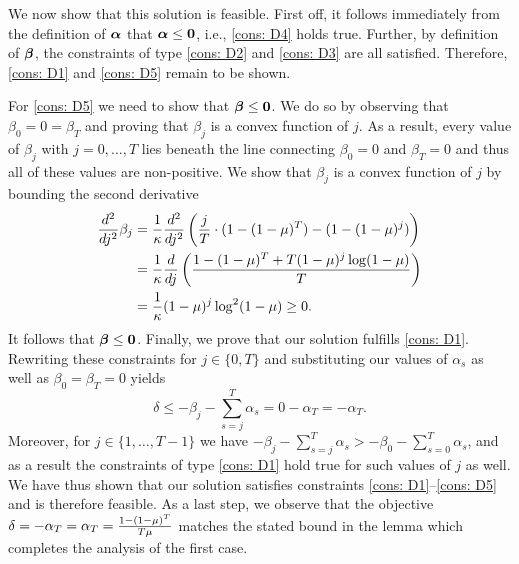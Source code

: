     We now show that this solution is feasible. First off, it follows immediately from the definition of $\bm{\alpha}$ that $\bm{\alpha} \leq \mathbf{0}$, i.e., \ref{cons: D4} holds true. Further, by definition of $\bm{\beta}$, the constraints of type \ref{cons: D2} and \ref{cons: D3} are all satisfied. Therefore, \ref{cons: D1} and \ref{cons: D5} remain to be shown.

    For \ref{cons: D5} we need to show that $\bm{\beta}\leq \mathbf{0}$. We do so by observing that $\beta_0=0=\beta_T$ and proving that $\beta_j$ is a convex function of $j$. As a result, every value of $\beta_j$ with $j = 0, \ldots, T$ lies beneath the line connecting $\beta_0 = 0$ and $\beta_T = 0$ and thus all of these values are non-positive. We show that $\beta_j$ is a convex function of $j$ by bounding the second derivative
     \begin{align*}
         \frac{d^2}{dj^2} \beta_j &= \frac{1}{\kappa} \frac{d^2}{dj^2} \left(  \frac{j}{T} \cdot (1-(1-\mu)^T)-(1-(1-\mu)^j) \right)\\
         &= \frac{1}{\kappa} \frac{d}{dj} \left( \frac{1 - (1-\mu)^T + T (1-\mu)^j \log(1-\mu)}{T} \right)\\
         &= \frac{1}{\kappa} (1-\mu)^j \log^2(1-\mu)\geq 0.
     \end{align*}
    It follows that $\bm{\beta}\leq \mathbf{0}$. Finally, we prove that our solution fulfills  \ref{cons: D1}. Rewriting these constraints for $j\in\{0,T\}$  and substituting our values of $\alpha_s$ as well as $\beta_0=\beta_T=0$  yields 
$$
\delta \leq -\beta_j - \sum_{s=j}^T \alpha_s = 0 - \alpha_T=-\alpha_T.
$$
Moreover, for $j\in\{1,\ldots,T-1\}$ we have $-\beta_j - \sum_{s=j}^T \alpha_s > -\beta_0 - \sum_{s=0}^T \alpha_s$, and as a result the constraints of type \ref{cons: D1} hold true for such values of $j$ as well. We have thus shown that our solution satisfies constraints \ref{cons: D1}--\ref{cons: D5} and is therefore feasible. As a last step, we observe that the objective $\delta = -\alpha_T=\alpha_T = \frac{1-(1-\mu)^T}{T\mu}$ matches the stated bound in the lemma which completes the analysis of the first case.


    

